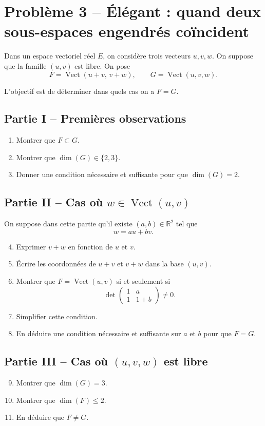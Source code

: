 \documentclass[11pt,a4paper]{article}
\newcommand{\R}{\mathbb{R}}
\newcommand{\Vect}{\operatorname{Vect}}
\newcommand{\dimv}{\operatorname{dim}}
\begin{document}
\section*{Problème 3 -- Élégant : quand deux sous-espaces engendrés coïncident}

Dans un espace vectoriel réel $E$, on considère trois vecteurs $u,v,w$.
On suppose que la famille $(u,v)$ est libre.
On pose
\[
F=\Vect(u+v,\,v+w),\qquad G=\Vect(u,v,w).
\]

L'objectif est de déterminer dans quels cas on a $F=G$.

\subsection*{Partie I -- Premières observations}
\begin{enumerate}[label=\arabic*.]
    \item Montrer que $F\subset G$.
    \item Montrer que $\dimv(G)\in\{2,3\}$.
    \item Donner une condition nécessaire et suffisante pour que $\dimv(G)=2$.
\end{enumerate}

\subsection*{Partie II -- Cas où $w\in\Vect(u,v)$}
On suppose dans cette partie qu'il existe $(a,b)\in\R^2$ tel que
\[
w=au+bv.
\]
\begin{enumerate}[label=\arabic*.]
    \setcounter{enumi}{3}
    \item Exprimer $v+w$ en fonction de $u$ et $v$.
    \item Écrire les coordonnées de $u+v$ et $v+w$ dans la base $(u,v)$.
    \item Montrer que $F=\Vect(u,v)$ si et seulement si
    \[
    \det\begin{pmatrix}
    1 & a\\
    1 & 1+b
    \end{pmatrix}\neq 0.
    \]
    \item Simplifier cette condition.
    \item En déduire une condition nécessaire et suffisante sur $a$ et $b$ pour que $F=G$.
\end{enumerate}

\subsection*{Partie III -- Cas où $(u,v,w)$ est libre}
\begin{enumerate}[label=\arabic*.]
    \setcounter{enumi}{8}
    \item Montrer que $\dimv(G)=3$.
    \item Montrer que $\dimv(F)\leq 2$.
    \item En déduire que $F\neq G$.
\end{enumerate}
\end{document}
